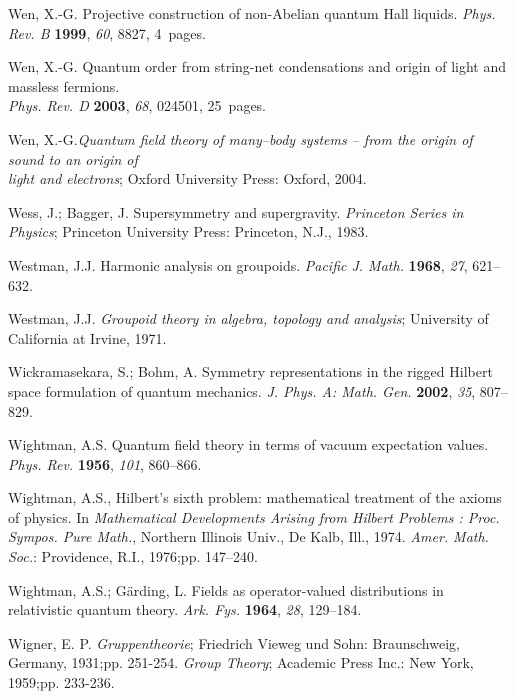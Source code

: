 \documentclass[12pt]{article}
\theoremstyle{plain}
\theoremstyle{definition}
\numberwithin{equation}{section}
\begin{document}
\begin{thebibliography}{199}
Wen, X.-G.  Projective construction of non-Abelian quantum Hall liquids. {\em Phys. Rev. B} {\bf 1999}, {\em 60}, 8827, 4~pages. %

Wen, X.-G. Quantum order from string-net condensations and origin of light and massless fermions.\\ {\em Phys. Rev. D} {\bf 2003}, {\em 68}, 024501, 25~pages. %

Wen, X.-G.{\em Quantum field theory of many--body systems -- from the origin of sound to an origin of\\  light and electrons}; Oxford University Press: Oxford, 2004.

Wess, J.; Bagger, J. Supersymmetry and supergravity. {\em Princeton Series in Physics}; Princeton University Press: Princeton, N.J., 1983.

Westman, J.J. Harmonic analysis on groupoids. {\em Pacific J. Math.} {\bf 1968}, {\em 27}, 621--632.

Westman, J.J. {\em Groupoid theory in algebra, topology and analysis}; University of California at Irvine, 1971.

Wickramasekara, S.; Bohm, A.  Symmetry representations in the rigged Hilbert space formulation of quantum mechanics.  {\em J. Phys. A: Math. Gen.} {\bf 2002}, {\em 35}, 807--829. 


Wightman, A.S. Quantum field theory in terms of vacuum expectation values. {\em Phys. Rev.} {\bf 1956}, {\em 101}, 860--866.

Wightman, A.S., Hilbert's sixth problem: mathematical treatment of the axioms of physics.  In {\em Mathematical Developments Arising from Hilbert Problems : Proc. Sympos. Pure Math.}, Northern Illinois Univ., De Kalb, Ill., 1974. {\em Amer. Math. Soc.}: Providence, R.I., 1976;pp. 147--240.

Wightman, A.S.; G\"arding,  L.  Fields as operator-valued distributions in relativistic quantum theory. {\em Ark. Fys.} {\bf 1964}, {\em 28}, 129--184.

 Wigner, E. P. \emph {Gruppentheorie}; Friedrich Vieweg und Sohn: Braunschweig, Germany, 1931;pp. 251-254. {\em Group Theory}; Academic Press Inc.: New York, 1959;pp. 233-236.


\end{thebibliography}
\end{document}
